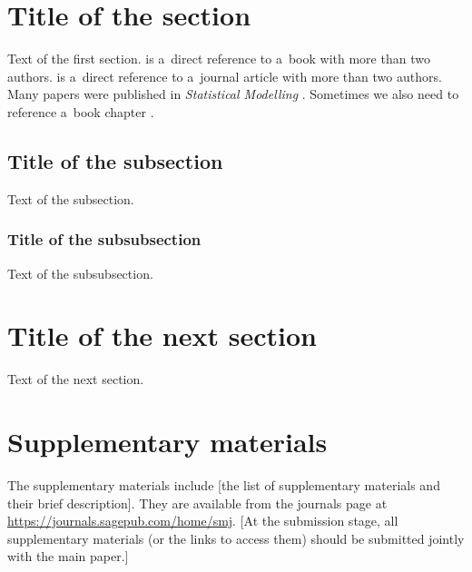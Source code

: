 \documentclass[submit]{smj}
\begin{document}
\maketitle


\section{Title of the section}
Text of the first section. \citet{Fahrmeiret13} is a~direct reference to a~book with more than two authors.
\citet{Gomezet09} is a~direct reference to a~journal article with more than two authors.
Many papers were published in \emph{Statistical Modelling} \citep[see, e.g.,][]{Kneib13, KomarekLesaffre06, Liet07, Waldmannet13}.
Sometimes we also need to reference a~book chapter \citep{Lesaffreet09}.

\subsection{Title of the subsection}
Text of the subsection.

\subsubsection{Title of the subsubsection}
Text of the subsubsection.

\section{Title of the next section}
Text of the next section.


\section*{Supplementary materials}
The supplementary materials include [the list of supplementary materials and their brief description]. They are available from the journals page at \url{https://journals.sagepub.com/home/smj}. [At the submission stage, all supplementary materials (or the links to access them) should be submitted jointly with the main paper.]
\end{document}
